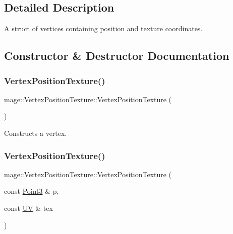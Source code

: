 \subsection{Detailed Description}
A struct of vertices containing position and texture coordinates. 

\subsection{Constructor \& Destructor Documentation}
\hypertarget{structmage_1_1_vertex_position_texture_ada4dbdc6e21b7408f1bfe69d821a4b48}{}\label{structmage_1_1_vertex_position_texture_ada4dbdc6e21b7408f1bfe69d821a4b48} 
\subsubsection{\texorpdfstring{Vertex\+Position\+Texture()}{VertexPositionTexture()}\hspace{0.1cm}{\footnotesize\ttfamily [1/4]}}
{\footnotesize\ttfamily mage\+::\+Vertex\+Position\+Texture\+::\+Vertex\+Position\+Texture (\begin{DoxyParamCaption}{ }\end{DoxyParamCaption})\hspace{0.3cm}{\ttfamily [default]}}

Constructs a vertex. \hypertarget{structmage_1_1_vertex_position_texture_aa4037156fff314fb2780db6e3acaea50}{}\label{structmage_1_1_vertex_position_texture_aa4037156fff314fb2780db6e3acaea50} 
\subsubsection{\texorpdfstring{Vertex\+Position\+Texture()}{VertexPositionTexture()}\hspace{0.1cm}{\footnotesize\ttfamily [2/4]}}
{\footnotesize\ttfamily mage\+::\+Vertex\+Position\+Texture\+::\+Vertex\+Position\+Texture (\begin{DoxyParamCaption}\item[{const \hyperlink{structmage_1_1_point3}{Point3} \&}]{p,  }\item[{const \hyperlink{structmage_1_1_u_v}{UV} \&}]{tex }\end{DoxyParamCaption})\hspace{0.3cm}{\ttfamily [explicit]}}

